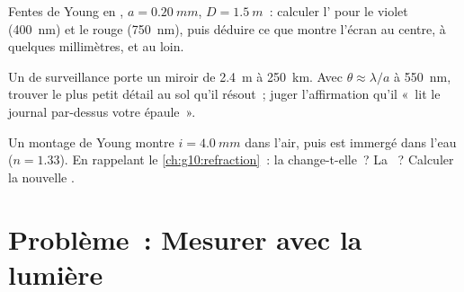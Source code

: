 \begin{exercise}[$\star\star\star$]\label{exo:g12:light-as-wave:13}
Fentes de Young en , $a = \qty{0.20}{mm}$,
$D = \qty{1.5}{m}$~: calculer l' pour le violet
(\qty{400}{nm}) et le rouge (\qty{750}{nm}), puis déduire ce que
montre l'écran au centre, à quelques millimètres, et au loin.
\end{exercise}

\begin{exercise}[$\star\star\star$]\label{exo:g12:light-as-wave:14}
Un  de surveillance porte un miroir de
\qty{2.4}{m} à \qty{250}{km}. Avec $\theta \approx \lambda/a$ à
\qty{550}{nm}, trouver le plus petit détail au sol qu'il résout~;
juger l'affirmation qu'il «~lit le journal par-dessus votre épaule~».
\end{exercise}

\begin{exercise}[$\star\star\star$]\label{exo:g12:light-as-wave:15}
Un montage de Young montre $i = \qty{4.0}{mm}$ dans l'air, puis est
immergé dans l'eau ($n = 1.33$). En rappelant le
\cref{ch:g10:refraction}~: la  change-t-elle~? La
~? Calculer la nouvelle
.
\end{exercise}

\section{Problème~: Mesurer avec la lumière}

